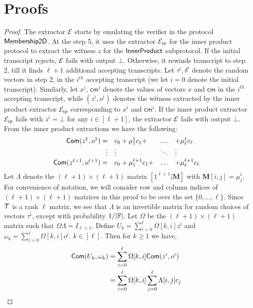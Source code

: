 \section{Proofs}
\begin{proof}
The extractor $\mathcal{E}$ starts by emulating the verifier in the protocol
$\mathsf{Membership2D}$. At the step 5, it uses the extractor $\mathcal{E}_{ip}$ for the
inner product protocol to extract the witness $z$ for the $\mathsf{InnerProduct}$
subprotocol. If the initial transcript rejects, $\mathcal{E}$ fails with output
$\bot$. Otherwise, it rewinds transcript to step 2, till it finds $\ell+1$
additional accepting transcripts. Let $\tau^i,\delta^i$ denote the random
vectors in step 2, in the $i^{th}$ accepting transcript (we let $i=0$ denote the
initial transcript). Similarly, let $x^i$, $\mathsf{cm}^i$ denote the values of
vectors $x$ and $\mathsf{cm}$ in the $i^{th}$ accepting transcript, while $(z^i,o^i)$
denotes the witness extracted by the inner product extractor $\mathcal{E}_{ip}$
corresponding to $x^i$ and $\mathsf{cm}^i$. If the inner product extractor
$\mathcal{E}_{ip}$ fails with $z^i=\bot$ for any $i\in [\ell+1]$, the extractor $\mathcal{E}$
fails with output $\bot$. From the inner product extractions we have the
following:
\begin{align*}
\begin{array}{rlll}
\mathsf{Com}(z^1,o^1)=& c_0 + \mu^1_1c_1+ & \hdots & +\mu^1_{\ell}c_{\ell} \\
\vdots & \vdots & \ddots & \vdots \\
\mathsf{Com}(z^{\ell+1},o^{\ell+1})=& c_0 + \mu^{\ell+1}_1c_1+ & \hdots & +\mu^{\ell+1}_{\ell}c_{\ell} 
\end{array}
\end{align*}
Let $\Lambda$ denote the $(\ell+1)\times (\ell+1)$ matrix $[1^{\ell+1}|\mathbf{M}]$ with $\mathbf{M}[i,j]=\mu^i_j$. For convenience of notation, we will consider row and column indices of $(\ell+1)\times (\ell+1)$ matrices in this proof to be over the set $\{0,\ldots,\ell\}$. 
Since $\mathcal{T}$ is a rank $\ell$ matrix, we see that $\Lambda$ is an invertible
matrix for random choices of vectors $\tau^i$, except with probability
$1/|\mathbb{F}|$. Let $\Omega$ be the $(\ell+1)\times (\ell+1)$ matrix such that
$\Omega\Lambda=I_{\ell+1}$. Define $U_k = \sum_{i=0}^{\ell}\Omega[k,i]z^i$ and $\omega_k=\sum_{i=0}^{\ell}\Omega[k,i]o^i$. 
$k\in [\ell]$. Then for $k\geq 1$ we have,
\begin{align*}
\comm(U_k,\omega_k) &= \sum_{i=0}^{\ell}\Omega[k,i]\comm(z^i,o^i)  \\
	&= \sum_{i=0}^{\ell}\Omega[k,i]\sum_{j=0}^{\ell}\Lambda[i,j]c_j \\

\end{align*}
\end{proof}
